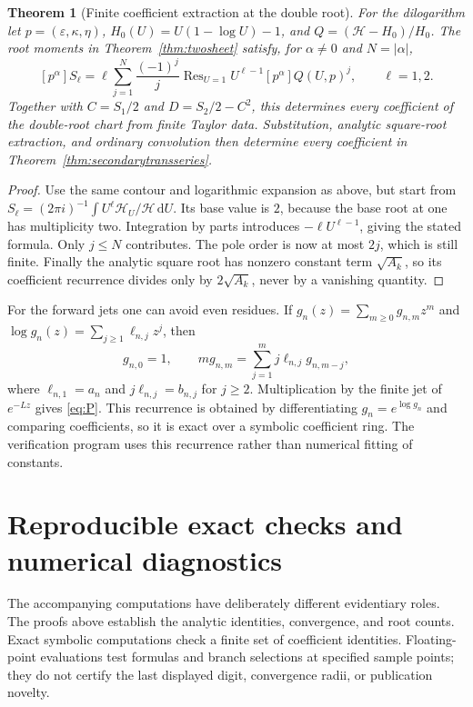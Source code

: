 \documentclass[11pt,a4paper]{article}
\numberwithin{equation}{section}
\newtheorem{theorem}{Theorem}[section]
\theoremstyle{definition}\newtheorem{definition}[theorem]{Definition}
\theoremstyle{remark}\newtheorem{remark}[theorem]{Remark}
\DeclareMathOperator{\Res}{Res}
\newcommand{\dd}{\,\mathrm d}\newcommand{\eps}{\varepsilon}
\newcommand{\HH}{\mathcal H}
\begin{document}
\begin{theorem}[Finite coefficient extraction at the double root]
\label{thm:residuedouble}
For the dilogarithm let $p=(\eps,\kappa,\eta)$,
$H_0(U)=U(1-\log U)-1$, and
$Q=(\HH-H_0)/H_0$. The root moments in
Theorem~\ref{thm:twosheet} satisfy, for $\alpha\ne0$ and
$N=|\alpha|$,
\begin{equation}\label{eq:residuedouble}
 [p^\alpha]S_\ell=
 \ell\sum_{j=1}^{N}\frac{(-1)^j}{j}
       \Res_{U=1}U^{\ell-1}[p^\alpha]Q(U,p)^j,
 \qquad \ell=1,2.
\end{equation}
Together with $C=S_1/2$ and $D=S_2/2-C^2$, this determines every
coefficient of the double-root chart from finite Taylor data. Substitution,
analytic square-root extraction, and ordinary convolution then determine
every coefficient in Theorem~\ref{thm:secondarytransseries}.
\end{theorem}
\begin{proof}
Use the same contour and logarithmic expansion as above, but start from
$S_\ell=(2\pi i)^{-1}\int U^\ell\HH_U/\HH\dd U$.
Its base value is $2$, because the base root at one has multiplicity two.
Integration by parts introduces $-\ell U^{\ell-1}$, giving the stated
formula. Only $j\le N$ contributes. The pole order is now at most $2j$,
which is still finite. Finally the analytic square root has nonzero
constant term $\sqrt{A_k}$, so its coefficient recurrence divides only by
$2\sqrt{A_k}$, never by a vanishing quantity.
\end{proof}

For the forward jets one can avoid even residues. If
$g_n(z)=\sum_{m\ge0}g_{n,m}z^m$ and
$\log g_n(z)=\sum_{j\ge1}\ell_{n,j}z^j$, then
\begin{equation}\label{eq:grecurrence}
 g_{n,0}=1,\qquad
 m g_{n,m}=\sum_{j=1}^{m}j\ell_{n,j}g_{n,m-j},
\end{equation}
where $\ell_{n,1}=a_n$ and $j\ell_{n,j}=b_{n,j}$ for $j\ge2$.
Multiplication by the finite jet of $e^{-Lz}$ gives
\eqref{eq:P}. This recurrence is obtained by differentiating $g_n=e^{\log
g_n}$ and comparing coefficients, so it is exact over a symbolic
coefficient ring. The verification program uses this recurrence rather
than numerical fitting of constants.

\section{Reproducible exact checks and numerical diagnostics}
\label{sec:verification}
The accompanying computations have deliberately different evidentiary
roles. The proofs above establish the analytic identities, convergence,
and root counts. Exact symbolic computations check a finite set of
coefficient identities. Floating-point evaluations test formulas and
branch selections at specified sample points; they do not certify the
last displayed digit, convergence radii, or publication novelty.
\end{document}
